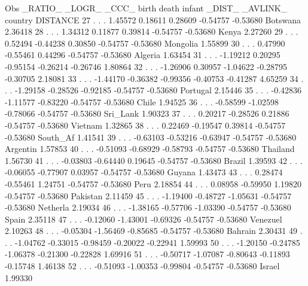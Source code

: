 \documentclass{article}
\begin{document}
\begin{Woutput}
Obs _RATIO_  _LOGR_  _CCC_    birth     death    infant    _DIST_   _AVLINK_  country   DISTANCE
 27    .        .      .     1.45572   0.18611   0.28609  -0.54757  -0.53680  Botswana   2.36418
 28    .        .      .     1.34312   0.11877   0.39814  -0.54757  -0.53680  Kenya      2.27260
 29    .        .      .     0.52494  -0.44238   0.30850  -0.54757  -0.53680  Mongolia   1.55899
 30    .        .      .     0.47990  -0.55461   0.44296  -0.54757  -0.53680  Algeria    1.63454
 31    .        .      .    -1.19212   0.20295  -0.95154  -0.26214  -0.26746             1.80864
 32    .        .      .    -1.26906   0.30957  -1.04622  -0.28795  -0.30705             2.18081
 33    .        .      .    -1.44170  -0.36382  -0.99356  -0.40753  -0.41287             4.65259
 34    .        .      .    -1.29158  -0.28526  -0.92185  -0.54757  -0.53680  Portugal   2.15446
 35    .        .      .    -0.42836  -1.11577  -0.83220  -0.54757  -0.53680  Chile      1.94525
 36    .        .      .    -0.58599  -1.02598  -0.78066  -0.54757  -0.53680  Sri_Lank   1.90323
 37    .        .      .     0.20217  -0.28526   0.21886  -0.54757  -0.53680  Vietnam    1.32865
 38    .        .      .     0.22469  -0.19547   0.39814  -0.54757  -0.53680  South_Af   1.41541
 39    .        .      .    -0.63103  -0.53216  -0.63947  -0.54757  -0.53680  Argentin   1.57853
 40    .        .      .    -0.51093  -0.68929  -0.58793  -0.54757  -0.53680  Thailand   1.56730
 41    .        .      .    -0.03803  -0.64440   0.19645  -0.54757  -0.53680  Brazil     1.39593
 42    .        .      .    -0.06055  -0.77907   0.03957  -0.54757  -0.53680  Guyana     1.43473
 43    .        .      .     0.28474  -0.55461   1.24751  -0.54757  -0.53680  Peru       2.18854
 44    .        .      .     0.08958  -0.59950   1.19820  -0.54757  -0.53680  Pakistan   2.11459
 45    .        .      .    -1.19400  -0.48727  -1.05631  -0.54757  -0.53680  Netherla   2.19034
 46    .        .      .    -1.38165  -0.57706  -1.03390  -0.54757  -0.53680  Spain      2.35118
 47    .        .      .    -0.12060  -1.43001  -0.69326  -0.54757  -0.53680  Venezuel   2.10263
 48    .        .      .    -0.05304  -1.56469  -0.85685  -0.54757  -0.53680  Bahrain    2.30431
 49    .        .      .    -1.04762  -0.33015  -0.98459  -0.20022  -0.22941             1.59993
 50    .        .      .    -1.20150  -0.24785  -1.06378  -0.21300  -0.22828             1.69916
 51    .        .      .    -0.50717  -1.07087  -0.80643  -0.11893  -0.15748             1.46138
 52    .        .      .    -0.51093  -1.00353  -0.99804  -0.54757  -0.53680  Israel     1.99330


\end{Woutput}
\end{document}
